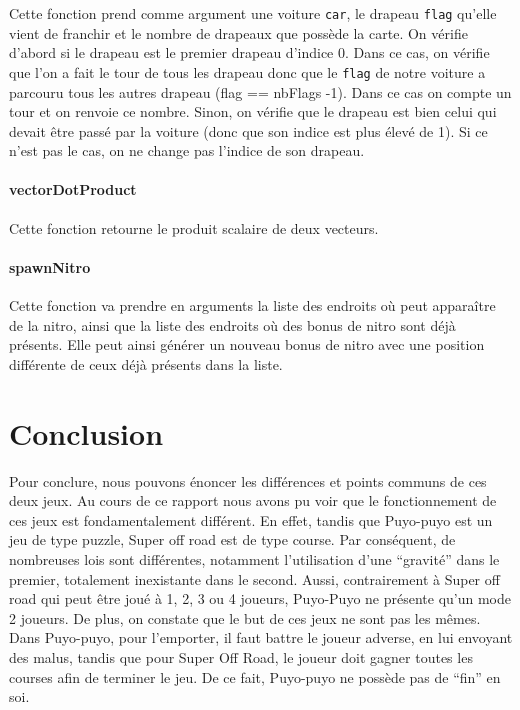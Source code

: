\documentclass[11pt, final]{report}
\renewcommand{\tt}[1]{\texttt{#1}}
\begin{document}
Cette fonction prend comme argument une voiture \tt{car}, le drapeau \tt{flag} qu'elle vient de franchir et le nombre de drapeaux que possède la carte. On vérifie d'abord si le drapeau est le premier drapeau d'indice 0. Dans ce cas, on vérifie que l'on a fait le tour de tous les drapeau donc que le \tt{flag} de notre voiture a parcouru tous les autres drapeau (flag == nbFlags -1). Dans ce cas on compte un tour et on renvoie ce nombre. Sinon, on vérifie que le drapeau est bien celui qui devait être passé par la voiture (donc que son indice est plus élevé de 1). Si ce n'est pas le cas, on ne change pas l'indice de son drapeau.
\\

\subsubsection{vectorDotProduct}



Cette fonction retourne le produit scalaire de deux vecteurs.
\\

\subsubsection{spawnNitro}



Cette fonction va prendre en arguments la liste des endroits où peut apparaître de la nitro, ainsi que la liste des endroits où des bonus de nitro sont déjà présents. Elle peut ainsi générer un nouveau bonus de nitro avec une position différente de ceux déjà présents dans la liste.

\chapter*{Conclusion}

Pour conclure, nous pouvons énoncer les différences et points communs de ces deux jeux. Au cours de ce rapport nous avons pu voir que le fonctionnement de ces jeux est fondamentalement différent. En effet, tandis que Puyo-puyo est un jeu de type puzzle, Super off road est de type course. Par conséquent, de nombreuses lois sont différentes, notamment l’utilisation d’une “gravité” dans le premier, totalement inexistante dans le second. Aussi, contrairement à Super off road qui peut être joué à 1, 2, 3 ou 4 joueurs, Puyo-Puyo ne présente qu'un mode 2 joueurs. De plus, on constate que le but de ces jeux ne sont pas les mêmes. Dans Puyo-puyo, pour l’emporter, il faut battre le joueur adverse, en lui envoyant des malus, tandis que pour Super Off Road, le joueur doit gagner toutes les courses afin de terminer le jeu. De ce fait, Puyo-puyo ne possède pas de “fin” en soi. 
\end{document}
